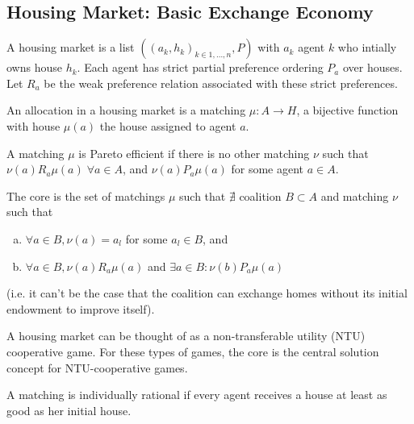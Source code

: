 




\subsection{Housing Market: Basic Exchange Economy}
\label{sec:hous-mark-basic}

\begin{definition}
  A housing market is a list $((a_k, h_k)_{k \in 1, \dots, n}, P)$
  with $a_k$ agent $k$ who intially owns house $h_k$. Each agent has
  strict partial preference ordering $P_a$ over houses. Let $R_a$ be
  the weak preference relation associated with these strict
  preferences.
\end{definition}

\begin{definition}[Allocation]
  An allocation in a housing market is a matching $\mu : A \to H$, a
  bijective function with house $\mu(a)$ the house assigned to agent
  $a$.
\end{definition}

\begin{definition}
  A matching $\mu$ is Pareto efficient if there is no other matching
  $\nu$ such that $\nu(a) R_a \mu(a) \; \forall a \in A$, and $\nu(a)
  P_a \mu(a)$ for some agent $a \in A$.
\end{definition}

\begin{definition}[Core]
  The core is the set of matchings $\mu$ such that $\nexists $
  coalition $B \subset A$ and matching $\nu$ such that 
  \begin{enumerate}[(a)]
  \item $\forall a \in B, \nu(a) = a_l$ for some $a_l \in B$, and
  \item $\forall a \in B, \nu(a) R_a \mu(a)$ and $\exists a \in B :
    \nu(b) P_a \mu(a)$
  \end{enumerate}
  (i.e. it can't be the case that the coalition can exchange homes
  without its initial endowment to improve itself).
\end{definition}

    
A housing market can be thought of as a non-transferable utility (NTU)
cooperative game. For these types of games, the core is the central
solution concept for NTU-cooperative games.


\begin{definition}
  A matching is individually rational if every agent receives a house
  at least as good as her initial house.
\end{definition}

